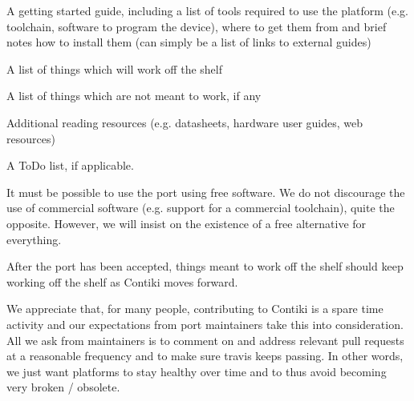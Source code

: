 \begin{DoxyItemize}
\begin{DoxyItemize}
\item A getting started guide, including a list of tools required to use the platform (e.\+g. toolchain, software to program the device), where to get them from and brief notes how to install them (can simply be a list of links to external guides)
\item A list of things which will work off the shelf
\item A list of things which are not meant to work, if any
\item Additional reading resources (e.\+g. datasheets, hardware user guides, web resources)
\item A To\+Do list, if applicable.
\end{DoxyItemize}
\item It must be possible to use the port using free software. We do not discourage the use of commercial software (e.\+g. support for a commercial toolchain), quite the opposite. However, we will insist on the existence of a free alternative for everything.
\end{DoxyItemize}

After the port has been accepted, things meant to work off the shelf should keep working off the shelf as Contiki moves forward.

We appreciate that, for many people, contributing to Contiki is a spare time activity and our expectations from port maintainers take this into consideration. All we ask from maintainers is to comment on and address relevant pull requests at a reasonable frequency and to make sure travis keeps passing. In other words, we just want platforms to stay healthy over time and to thus avoid becoming very broken / obsolete. 